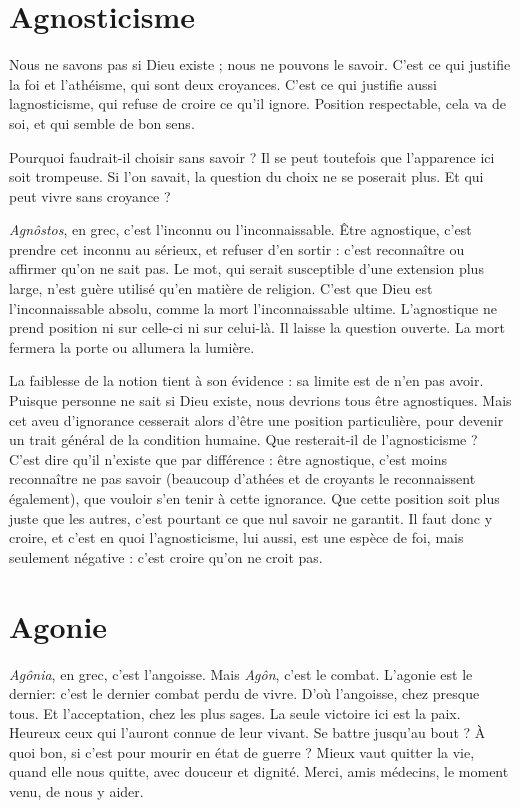 \section{Agnosticisme}
Nous ne savons pas si Dieu existe ; nous ne pouvons le
savoir. C’est ce qui justifie la foi et l’athéisme, qui sont
deux croyances. C’est ce qui justifie aussi lagnosticisme, qui refuse de croire ce
qu’il ignore. Position respectable, cela va de soi, et qui semble de bon sens.

Pourquoi faudrait-il choisir sans savoir ? Il se peut toutefois que l’apparence ici
soit trompeuse. Si l’on savait, la question du choix ne se poserait plus. Et qui
peut vivre sans croyance ?

{\it Agnôstos}, en grec, c’est l'inconnu ou l’inconnaissable. Être agnostique, c’est
prendre cet inconnu au sérieux, et refuser d’en sortir : c’est reconnaître ou
affirmer qu’on ne sait pas. Le mot, qui serait susceptible d’une extension plus
large, n’est guère utilisé qu’en matière de religion. C’est que Dieu est l’inconnaissable
absolu, comme la mort l’inconnaissable ultime. L’agnostique ne
prend position ni sur celle-ci ni sur celui-là. Il laisse la question ouverte. La
mort fermera la porte ou allumera la lumière.

La faiblesse de la notion tient à son évidence : sa limite est de n’en pas
avoir. Puisque personne ne sait si Dieu existe, nous devrions tous être agnostiques.
Mais cet aveu d’ignorance cesserait alors d’être une position particulière,
pour devenir un trait général de la condition humaine. Que resterait-il de
l’agnosticisme ? C’est dire qu’il n’existe que par différence : être agnostique,
c'est moins reconnaître ne pas savoir (beaucoup d’athées et de croyants le
reconnaissent également), que vouloir s’en tenir à cette ignorance. Que cette
position soit plus juste que les autres, c’est pourtant ce que nul savoir ne
garantit. Il faut donc y croire, et c’est en quoi l’agnosticisme, lui aussi, est une
espèce de foi, mais seulement négative : c’est croire qu’on ne croit pas.

\section{Agonie}
{\it Agônia}, en grec, c’est l’angoisse. Mais {\it Agôn}, c’est le combat. L’agonie
est le dernier: c’est le dernier combat perdu de vivre. D'où
l'angoisse, chez presque tous. Et l’acceptation, chez les plus sages. La seule victoire
ici est la paix. Heureux ceux qui l’auront connue de leur vivant. Se battre
jusqu’au bout ? À quoi bon, si c’est pour mourir en état de guerre ? Mieux vaut
quitter la vie, quand elle nous quitte, avec douceur et dignité. Merci, amis
médecins, le moment venu, de nous y aider.

